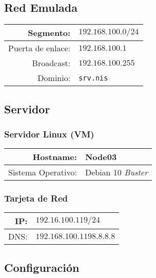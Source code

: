 \documentclass[../main.tex]{subfiles}
\begin{document}
\subsection{Red Emulada}\label{sec:red_emu}

\begin{table}[H]
  \centering
  \begin{tabular}{|rl|}
    \hline
    Segmento:&$192.168.100.0/24$\\\hline
    Puerta de enlace:&$192.168.100.1$\\\hline
    Broadcast:&$192.168.100.255$\\\hline
    Dominio:&\lstinline|srv.nis|\\\hline
  \end{tabular}
\end{table}

\subsection{Servidor}\label{sec:servidor}

\subsubsection{Servidor Linux (VM)}\label{sec:slvm}


\begin{table}[H]
  \centering
  \begin{tabular}{|rl|}
    \hline
    Hostname: &Node03\\\hline{}
    Sistema Operativo: & Debian 10 \textit{Buster}\\\hline
  \end{tabular}
\end{table}

\subsubsection{Tarjeta de Red}\label{sec:tr}

\begin{table}[H]
  \centering
  \begin{tabular}{|rl|}
    \hline{}
    IP:&$192.16.100.119/24$\\\hline{}
    DNS:&$192.168.100.119 8.8.8.8$\\\hline
  \end{tabular}
\end{table}

\subsection{Configuración}\label{sec:serv_conf}
\end{document}
